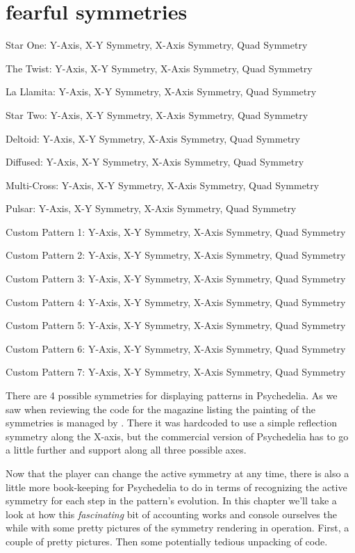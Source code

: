 \chapter{fearful symmetries} 
\label{sec:symmetries}
\rhead[]{\leftmark}
\lstset{style=6502Style}

\newcommand\addItem[2]%
{
  \expandafter\def\csname row:#1\endcsname{#2}%
}

\newcommand\showItem[1]%
{\expandafter\csname row:#1\endcsname}


\newcommand\getItem[1]%
{\noindent
  \text{\showItem{#1}}
  \par
}
\addItem{0}{Star One: Y-Axis, X-Y Symmetry, X-Axis Symmetry, Quad Symmetry}
\addItem{1}{The Twist: Y-Axis, X-Y Symmetry, X-Axis Symmetry, Quad Symmetry}
\addItem{2}{La Llamita: Y-Axis, X-Y Symmetry, X-Axis Symmetry, Quad Symmetry}
\addItem{3}{Star Two: Y-Axis, X-Y Symmetry, X-Axis Symmetry, Quad Symmetry}
\addItem{4}{Deltoid: Y-Axis, X-Y Symmetry, X-Axis Symmetry, Quad Symmetry}
\addItem{5}{Diffused: Y-Axis, X-Y Symmetry, X-Axis Symmetry, Quad Symmetry}
\addItem{6}{Multi-Cross: Y-Axis, X-Y Symmetry, X-Axis Symmetry, Quad Symmetry}
\addItem{7}{Pulsar: Y-Axis, X-Y Symmetry, X-Axis Symmetry, Quad Symmetry}
\addItem{8}{Custom Pattern 1: Y-Axis, X-Y Symmetry, X-Axis Symmetry, Quad Symmetry}
\addItem{9}{Custom Pattern 2: Y-Axis, X-Y Symmetry, X-Axis Symmetry, Quad Symmetry}
\addItem{10}{Custom Pattern 3: Y-Axis, X-Y Symmetry, X-Axis Symmetry, Quad Symmetry}
\addItem{11}{Custom Pattern 4: Y-Axis, X-Y Symmetry, X-Axis Symmetry, Quad Symmetry}
\addItem{12}{Custom Pattern 5: Y-Axis, X-Y Symmetry, X-Axis Symmetry, Quad Symmetry}
\addItem{13}{Custom Pattern 6: Y-Axis, X-Y Symmetry, X-Axis Symmetry, Quad Symmetry}
\addItem{14}{Custom Pattern 7: Y-Axis, X-Y Symmetry, X-Axis Symmetry, Quad Symmetry}

There are 4 possible symmetries for displaying patterns in Psychedelia. As we saw when
reviewing the code for the magazine listing the painting of the symmetries is managed
by . There it was hardcoded to use a simple
reflection symmetry along the X-axis, but the commercial version of Psychedelia has to
go a little further and support along all three possible axes. 

Now that the player can change the active symmetry at any time, there is also a little more
book-keeping for Psychedelia to do in terms of recognizing the active symmetry for each
step in the pattern's evolution. In this chapter we'll take a look at how this 
\textit{fascinating} bit of accounting works and console ourselves the while with some
pretty pictures of the symmetry rendering in operation. First, a couple of pretty pictures.
Then some potentially tedious unpacking of code.

